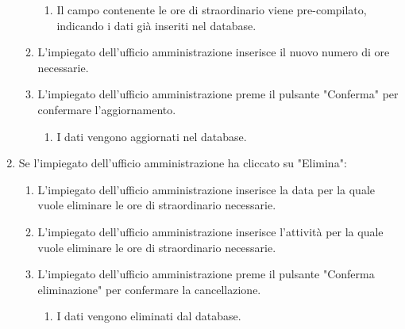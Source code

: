 \begin{enumerate}
\begin{enumerate}
\begin{enumerate}
					\item Il campo contenente le ore di straordinario viene pre-compilato, indicando i dati già inseriti nel database.
				\end{enumerate}
			\item L'impiegato dell'ufficio amministrazione inserisce il nuovo numero di ore necessarie.
			\item L'impiegato dell'ufficio amministrazione preme il pulsante "Conferma" per confermare l'aggiornamento.
				\begin{enumerate}
					\item I dati vengono aggiornati nel database.
				\end{enumerate}
		\end{enumerate}
	\item Se l'impiegato dell'ufficio amministrazione ha cliccato su "Elimina":
		\begin{enumerate}
			\item L'impiegato dell'ufficio amministrazione inserisce la data per la quale vuole eliminare le ore di straordinario necessarie.
			\item L'impiegato dell'ufficio amministrazione inserisce l'attività per la quale vuole eliminare le ore di straordinario necessarie.
			\item L'impiegato dell'ufficio amministrazione preme il pulsante "Conferma eliminazione" per confermare la cancellazione.
				\begin{enumerate}
					\item I dati vengono eliminati dal database.
				\end{enumerate}
		\end{enumerate}	
\end{enumerate}
